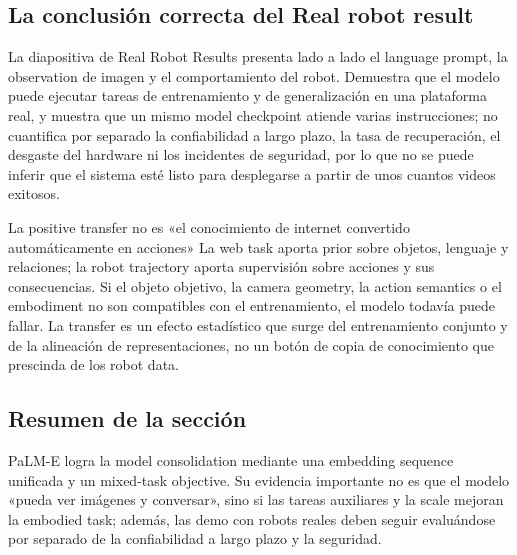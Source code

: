 \subsection{La conclusión correcta del Real robot result}

La diapositiva de Real Robot Results presenta lado a lado el language prompt, la observation de imagen y el comportamiento del robot. Demuestra que el modelo puede ejecutar tareas de entrenamiento y de generalización en una plataforma real, y muestra que un mismo model checkpoint atiende varias instrucciones; no cuantifica por separado la confiabilidad a largo plazo, la tasa de recuperación, el desgaste del hardware ni los incidentes de seguridad, por lo que no se puede inferir que el sistema esté listo para desplegarse a partir de unos cuantos videos exitosos.


\begin{warningbox}{La positive transfer no es «el conocimiento de internet convertido automáticamente en acciones»}
La web task aporta prior sobre objetos, lenguaje y relaciones; la robot trajectory aporta supervisión sobre acciones y sus consecuencias. Si el objeto objetivo, la camera geometry, la action semantics o el embodiment no son compatibles con el entrenamiento, el modelo todavía puede fallar. La transfer es un efecto estadístico que surge del entrenamiento conjunto y de la alineación de representaciones, no un botón de copia de conocimiento que prescinda de los robot data.
\end{warningbox}

\subsection{Resumen de la sección}

PaLM-E logra la model consolidation mediante una embedding sequence unificada y un mixed-task objective. Su evidencia importante no es que el modelo «pueda ver imágenes y conversar», sino si las tareas auxiliares y la scale mejoran la embodied task; además, las demo con robots reales deben seguir evaluándose por separado de la confiabilidad a largo plazo y la seguridad.
